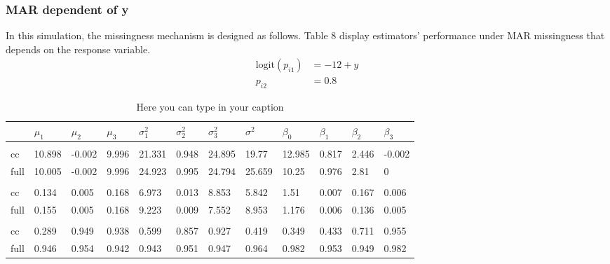 \documentclass[
  twocolumn]{article}
\begin{document}
\hypertarget{mar-dependent-of-y}{%
\subsubsection{MAR dependent of y}\label{mar-dependent-of-y}}

In this simulation, the missingness mechanism is designed as follows.
Table 8 display estimators' performance under MAR missingness that
depends on the response variable. \[
\begin{aligned}
\mathrm{logit}(p_{i1}) &= -12 + y \\
p_{i2} &= 0.8
\end{aligned}
\]

\begin{table*}[hbp]
\caption{Here you can type in your caption}
\begingroup\fontsize{7}{9}\selectfont

\begin{tabu} to 
\toprule
 & $\mu_1$ & $\mu_2$ & $\mu_3$ & $\sigma^2_1$ & $\sigma^2_2$ & $\sigma^2_3$ & $\sigma^2$ & $\beta_0$ & $\beta_1$ & $\beta_2$ & $\beta_3$\\
\midrule
\addlinespace[0.3em]
\\
\hspace{1em}cc & 10.898 & -0.002 & 9.996 & 21.331 & 0.948 & 24.895 & 19.77 & 12.985 & 0.817 & 2.446 & -0.002\\
\hspace{1em}full & 10.005 & -0.002 & 9.996 & 24.923 & 0.995 & 24.794 & 25.659 & 10.25 & 0.976 & 2.81 & 0\\
\addlinespace[0.3em]
\\
\hspace{1em}cc & 0.134 & 0.005 & 0.168 & 6.973 & 0.013 & 8.853 & 5.842 & 1.51 & 0.007 & 0.167 & 0.006\\
\hspace{1em}full & 0.155 & 0.005 & 0.168 & 9.223 & 0.009 & 7.552 & 8.953 & 1.176 & 0.006 & 0.136 & 0.005\\
\addlinespace[0.3em]
\\
\hspace{1em}cc & 0.289 & 0.949 & 0.938 & 0.599 & 0.857 & 0.927 & 0.419 & 0.349 & 0.433 & 0.711 & 0.955\\
\hspace{1em}full & 0.946 & 0.954 & 0.942 & 0.943 & 0.951 & 0.947 & 0.964 & 0.982 & 0.953 & 0.949 & 0.982\\
\bottomrule
\end{tabu}
\endgroup{}
\end{table*}
\end{document}
